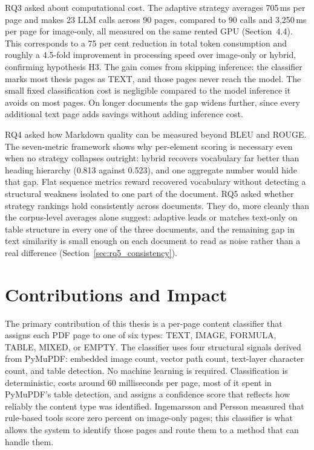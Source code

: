 RQ3 asked about computational cost. The adaptive strategy averages 705\,ms
per page and makes 23 LLM calls across 90 pages, compared to 90 calls and
3{,}250\,ms per page for image-only, all measured on the same rented GPU
(Section~4.4). This corresponds to a 75 per cent reduction in total token
consumption and roughly a 4.5-fold improvement in processing speed over
image-only or hybrid, confirming hypothesis H3. The gain comes from
skipping inference: the classifier marks most thesis pages as TEXT, and
those pages never reach the model. The small fixed classification
cost is negligible compared to the model inference it avoids on most pages.
On longer documents the gap widens further, since every additional text
page adds savings without adding inference cost.

RQ4 asked how Markdown quality can be measured beyond BLEU and ROUGE. The
seven-metric framework shows why per-element scoring is necessary even when
no strategy collapses outright: hybrid recovers vocabulary far better than
heading hierarchy (0.813 against 0.523), and one aggregate number would
hide that gap. Flat sequence metrics reward
recovered vocabulary without detecting a structural weakness isolated to
one part of the document. RQ5 asked whether strategy rankings hold
consistently across documents. They do, more cleanly than the corpus-level
averages alone suggest: adaptive leads or matches text-only on table
structure in every one of the three documents, and the remaining gap in
text similarity is small enough on each document to read as noise rather
than a real difference (Section~\ref{sec:rq5_consistency}).

\section{Contributions and Impact}

The primary contribution of this thesis is a per-page content classifier that
assigns each PDF page to one of six types: TEXT, IMAGE, FORMULA, TABLE, MIXED,
or EMPTY. The classifier uses four structural signals derived from PyMuPDF:
embedded image count, vector path count, text-layer character count, and
table detection. No machine learning is required. Classification is
deterministic, costs around 60 milliseconds per page, most of it spent in
PyMuPDF's table detection, and assigns a confidence
score that reflects how reliably the content type was identified. Ingemarsson and
Persson \autocite{ingemarsson2024} measured that rule-based tools score zero
percent on image-only pages; this classifier is what allows the system to identify
those pages and route them to a method that can handle them.

